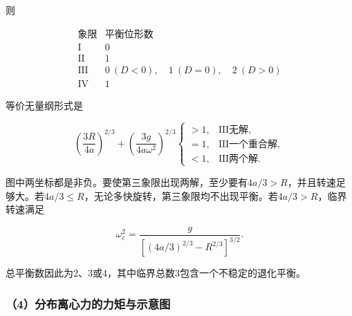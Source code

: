 \documentclass[12pt,a4paper,fontset=fandol]{ctexart}
\begin{document}
则

\[
\boxed{\begin{array}{c|c}
\text{象限}&\text{平衡位形数}\\ \hline
\mathrm I&0\\
\mathrm {II}&1\\
\mathrm {III}&0\ (D<0),\quad1\ (D=0),\quad2\ (D>0)\\
\mathrm {IV}&1
\end{array}}
\]

等价无量纲形式是

\[
\left(\frac{3R}{4a}\right)^{2/3}
+\left(\frac{3g}{4a\omega^2}\right)^{2/3}
\begin{cases}>1,&\mathrm{III}\text{无解},\\
=1,&\mathrm{III}\text{一个重合解},\\
<1,&\mathrm{III}\text{两个解}.
\end{cases}
\]

\begin{center}
\begin{minipage}{\linewidth}
\centering\begingroup{}
\ifdim\wd\diagrambox>.88\linewidth
\sbox{\diagrambox}{\resizebox{.88\linewidth}{!}{\usebox{\diagrambox}}}\fi
\ifdim\ht\diagrambox>.38\textheight
\resizebox{!}{.38\textheight}{\usebox{\diagrambox}}
\else\usebox{\diagrambox}\fi
\par{}\endgroup\end{minipage}\end{center}

图中两坐标都是非负。要使第三象限出现两解，至少要有\(4a/3>R\)，并且转速足够大。若\(4a/3\leq R\)，无论多快旋转，第三象限均不出现平衡。若\(4a/3>R\)，临界转速满足

\[
\omega_c^2=
\frac{g}{[(4a/3)^{2/3}-R^{2/3}]^{3/2}}.
\]

总平衡数因此为2、3或4，其中临界总数3包含一个不稳定的退化平衡。

\subsubsection{（4）分布离心力的力矩与示意图}\label{ux5206ux5e03ux79bbux5fc3ux529bux7684ux529bux77e9ux4e0eux793aux610fux56fe}
\end{document}

